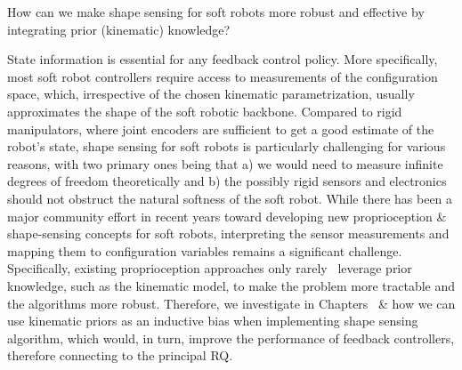 \begin{researchquestion}\label{rq:shape_sensing}
    How can we make shape sensing for soft robots more robust and effective by integrating prior (kinematic) knowledge?
\end{researchquestion}
State information is essential for any feedback control policy. More specifically, most soft robot controllers require access to measurements of the configuration space, which, irrespective of the chosen kinematic parametrization, usually approximates the shape of the soft robotic backbone.
Compared to rigid manipulators, where joint encoders are sufficient to get a good estimate of the robot's state, shape sensing for soft robots is particularly challenging for various reasons, with two primary ones being that a) we would need to measure infinite degrees of freedom theoretically and b) the possibly rigid sensors and electronics should not obstruct the natural softness of the soft robot.
While there has been a major community effort in recent years toward developing new proprioception \& shape-sensing concepts for soft robots, interpreting the sensor measurements and mapping them to configuration variables remains a significant challenge. Specifically, existing proprioception approaches only rarely~\cite{stella2023soft} leverage prior knowledge, such as the kinematic model, to make the problem more tractable and the algorithms more robust.
Therefore, we investigate in Chapters~\circled{\ref{chp:srslam}} \& \circled{\ref{chp:promasens}} how we can use kinematic priors as an inductive bias when implementing shape sensing algorithm, which would, in turn, improve the performance of feedback controllers, therefore connecting to the principal \gls{RQ}.

